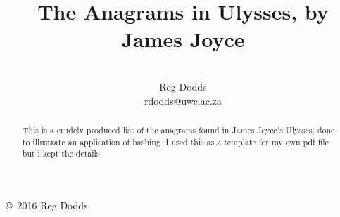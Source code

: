\documentclass[11pt]{report}
\author{%
  \\[72pt]
  \Huge Reg Dodds\\[5pt]
  {\small rdodds@uwc.ac.za}
}
\title{%
  {\fontsize{48pt}{56pt}\usefont{OT1}{ptm}{b}{n}\selectfont
  \color{blue} The Anagrams in Ulysses, by James Joyce}
}
\begin{document}
\maketitle
\newpage

\noindent\copyright\ 2016 Reg Dodds.
\newpage

\renewcommand{\abstractname}{Foreword}
\begin{abstract}
This is a crudely produced list of the anagrams found in James Joyce's
Ulysses, done to illustrate an application of hashing. I used this as a template for my own pdf file but i kept the details
\end{abstract}
\thispagestyle{empty}
\setcounter{page}{0}
\mbox{\hspace{12pt}}
\newpage

\noindent
\twocolumn

\vfill
\end{document}
